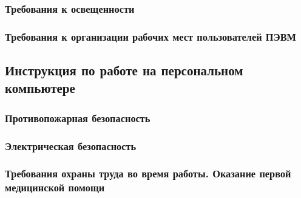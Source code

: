 \subsubsection{Требования к освещенности}

\subsubsection{Требования к организации рабочих мест пользователей ПЭВМ}


\subsection{Инструкция по работе на персональном компьютере}

\subsubsection{Противопожарная безопасность}

\subsubsection{Электрическая безопасность}

\subsubsection{Требования охраны труда во время работы. Оказание первой медицинской помощи}